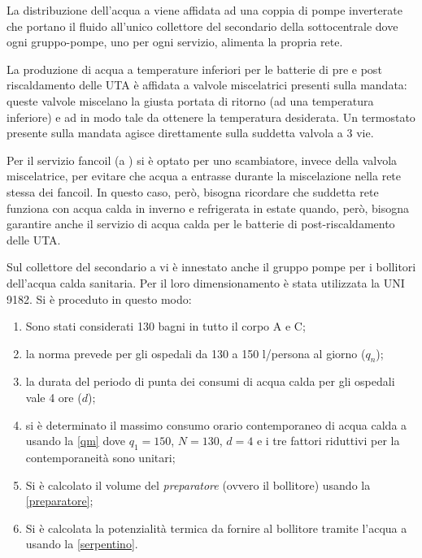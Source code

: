 La distribuzione dell'acqua a  viene affidata ad una coppia di pompe inverterate che portano il fluido all'unico collettore del secondario della sottocentrale dove ogni gruppo-pompe, uno per ogni servizio, alimenta la propria rete. 

La produzione di acqua a temperature inferiori per le batterie di pre e post riscaldamento delle UTA è affidata a valvole miscelatrici presenti sulla mandata: queste valvole miscelano la giusta portata di ritorno (ad una temperatura inferiore) e ad  in modo tale da ottenere la temperatura desiderata. Un termostato presente sulla mandata agisce direttamente sulla suddetta valvola a 3 vie.

Per il servizio fancoil (a ) si è optato per uno scambiatore, invece della valvola miscelatrice, per evitare che acqua a  entrasse durante la miscelazione nella rete stessa dei fancoil. In questo caso, però, bisogna ricordare che suddetta rete funziona con acqua calda in inverno e refrigerata in estate quando, però, bisogna garantire anche il servizio di acqua calda per le batterie di post-riscaldamento delle UTA.

Sul collettore del secondario a  vi è innestato anche il gruppo pompe per i bollitori dell'acqua calda sanitaria. Per il loro dimensionamento è stata utilizzata la UNI 9182. Si è proceduto in questo modo:
\begin{enumerate}
	\item Sono stati considerati 130 bagni in tutto il corpo A e C;
	\item la norma prevede per gli ospedali da \num{130} a \num{150} \si{l/persona} al giorno ($q_n$);
	\item la durata del periodo di punta dei consumi di acqua calda per gli ospedali vale 4 ore ($d$);
	\item si è determinato il massimo consumo orario contemporaneo di acqua calda a  usando la \vref{qm} dove $q_1=150$, $N=130$, $d=4$ e i tre fattori riduttivi per la contemporaneità sono unitari;
	\item Si è calcolato il volume del \emph{preparatore} (ovvero il bollitore) usando la \vref{preparatore};
	\item Si è calcolata la potenzialità termica da fornire al bollitore tramite l'acqua a  usando la \vref{serpentino}.
\end{enumerate}

